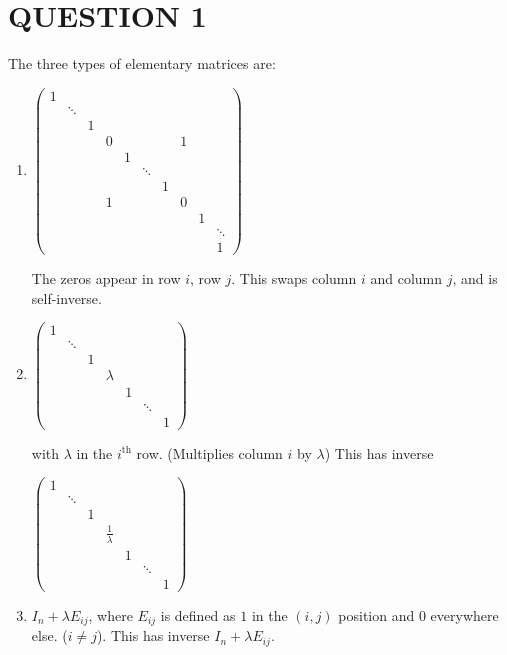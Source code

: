 \documentclass[a4paper]{article}
\begin{document}
	
	\maketitle
	
\section{QUESTION 1}

The three types of elementary matrices are:

\begin{enumerate}
	\item $ \begin{pmatrix}
	1\\
	& \ddots\\
	& & 1\\
	& & & 0 & & & & 1\\
	& & & & 1\\
	& & & & & \ddots\\
	& & & & & & 1\\
	& & & 1 & & & & 0\\
	& & & & & & & & 1\\
	& & & & & & & & & \ddots\\
	& & & & & & & & & 1
	\end{pmatrix} $
	
	The zeros appear in row $ i $, row $ j $.
	This swaps column $ i $ and column $ j $, and is self-inverse.
	
	\item $ \begin{pmatrix}
	1 & & & & & &\\
	& \ddots & & & & & \\
	& & 1 & & & & \\
	& & & \lambda & & & \\
	& & & & 1 & & \\
	& & & & & \ddots & \\
	& & & & & & 1
	\end{pmatrix} $
	
	with $ \lambda $ in the $ i^{\text{th}} $ row. (Multiplies column $ i $ by $ \lambda $) This has inverse
	
	$ \begin{pmatrix}
	1 & & & & & &\\
	& \ddots & & & & & \\
	& & 1 & & & & \\
	& & & \frac{1}{\lambda} & & & \\
	& & & & 1 & & \\
	& & & & & \ddots & \\
	& & & & & & 1
	\end{pmatrix} $
	
	\item $ I_{n} + \lambda E_{ij}  $, where $ E_{ij} $ is defined as $ 1 $ in the $ (i,j) $ position and $ 0 $ everywhere else. ($ i \neq j $). This has inverse $ I_{n} + \lambda E_{ij}  $.
	
	
	
\end{enumerate}
\end{document}
